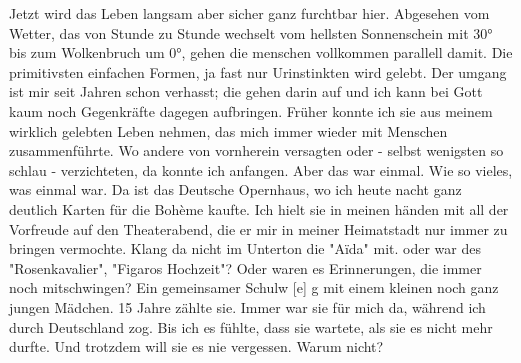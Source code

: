 \def\day{14. Juni 1943.}
\mktitle

Jetzt wird das Leben langsam aber sicher ganz furchtbar hier.
Abgesehen vom Wetter, das von Stunde zu Stunde wechselt vom hellsten Sonnenschein mit 30° bis zum Wolkenbruch um 0°, gehen die menschen vollkommen parallell damit.
Die primitivsten einfachen Formen, ja fast nur Urinstinkten wird gelebt.
Der umgang ist mir seit Jahren schon verhasst; die gehen darin auf und ich kann bei Gott kaum noch Gegenkr\"{a}fte dagegen aufbringen. Fr\"{u}her konnte ich sie aus meinem wirklich gelebten Leben nehmen, das mich immer wieder mit Menschen zusammenf\"{u}hrte.
Wo andere von vornherein versagten oder - selbst wenigsten so schlau - verzichteten, da konnte ich anfangen.
Aber das war einmal.
Wie so vieles, was einmal war.
Da ist das Deutsche Opernhaus, wo ich heute nacht ganz deutlich Karten f\"{u}r die Bohème kaufte.
Ich hielt sie in meinen h\"{a}nden mit all der Vorfreude auf den Theaterabend, die er mir in meiner Heimatstadt nur immer zu bringen vermochte.
Klang da nicht im Unterton die "Aïda" mit. oder war des "Rosenkavalier", "Figaros Hochzeit"?
Oder waren es Erinnerungen, die immer noch mitschwingen?
Ein gemeinsamer Schulw{\color{red} [e] }g mit einem kleinen noch ganz jungen M\"{a}dchen.
15 Jahre z\"{a}hlte sie.
Immer war sie f\"{u}r mich da, w\"{a}hrend ich durch Deutschland zog.
Bis ich es f\"{u}hlte, dass sie wartete, als sie es nicht mehr durfte.
Und trotzdem will sie es nie vergessen.
Warum nicht?

\clearpage
